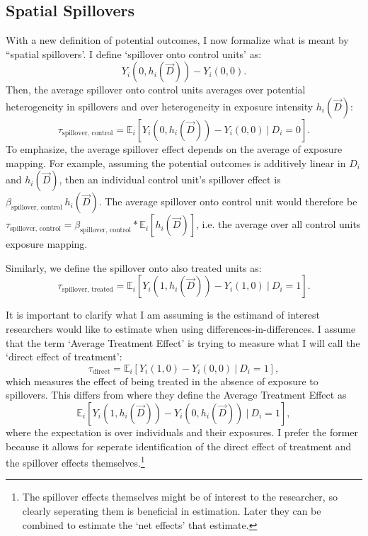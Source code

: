 \documentclass[11pt]{article}
\begin{document}
\subsection{Spatial Spillovers}

With a new definition of potential outcomes, I now formalize what is meant by ``spatial spillovers'. I define `spillover onto control units' as: \[
    Y_{i}(0, h_i(\vec{D})) - Y_{i}(0, 0).
\] 
Then, the average spillover onto control units averages over potential heterogeneity in spillovers and over heterogeneity in exposure intensity $h_i(\vec{D})$: \[
    \tau_{\text{spillover, control}} = \mathbb{E}_i \left[ Y_{i}(0, h_i(\vec{D})) - Y_{i}(0, 0) \ \vert \ D_i = 0 \right].
\]
To emphasize, the average spillover effect depends on the average of exposure mapping. For example, assuming the potential outcomes is additively linear in $D_i$ and $h_i(\vec{D})$, then an individual control unit's spillover effect is $\beta_{\text{spillover, control}} \ h_i(\vec{D})$. The average spillover onto control unit would therefore be $\tau_{\text{spillover, control}} = \beta_{\text{spillover, control}} * \mathbb{E}_{i} \left[ h_i(\vec{D})\right]$, i.e. the average over all control units exposure mapping.

Similarly, we define the spillover onto also treated units as: \[ 
    \tau_{\text{spillover, treated}} = \mathbb{E}_i \left[ Y_{i}(1, h_i(\vec{D})) - Y_{i}(1, 0) \ \vert \ D_i = 1 \right].
\] 

It is important to clarify what I am assuming is the estimand of interest researchers would like to estimate when using differences-in-differences. I assume that the term `Average Treatment Effect' is trying to measure what I will call the `direct effect of treatment': \[
    \tau_{\text{direct}} = \mathbb{E}_i \left[ Y_{i}(1, 0) - Y_{i}(0, 0) \ \vert \ D_i = 1 \right],
\] 
which measures the effect of being treated in the absence of exposure to spillovers. This differs from \citet{Sävje_Aronow_Hudgens_2019} where they define the Average Treatment Effect as \[ 
    \mathbb{E}_i \left[ Y_{i}(1, h_i(\vec{D})) - Y_{i}(0, h_i(\vec{D})) \ \vert \ D_i = 1 \right],
\] 
where the expectation is over individuals and their exposures. I prefer the former because it allows for seperate identification of the direct effect of treatment and the spillover effects themselves.\footnote{The spillover effects themselves might be of interest to the researcher, so clearly seperating them is beneficial in estimation. Later they can be combined to estimate the `net effects' that \citet{Sävje_Aronow_Hudgens_2019} estimate.}
\end{document}

